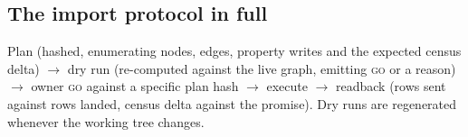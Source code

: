 \subsection{The import protocol in full}

Plan (hashed, enumerating nodes, edges, property writes and the expected census
delta) $\to$ dry run (re-computed against the live graph, emitting \textsc{go} or a
reason) $\to$ owner \textsc{go} against a specific plan hash $\to$ execute $\to$
readback (rows sent against rows landed, census delta against the promise). Dry runs
are regenerated whenever the working tree changes.
